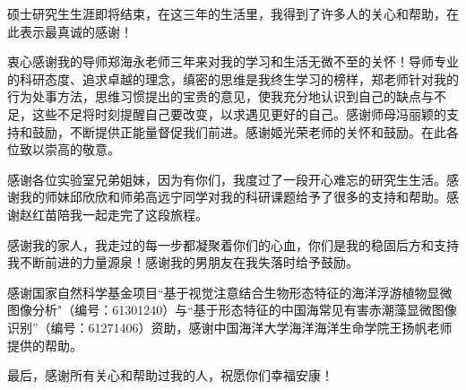 
\begin{ack}
硕士研究生生涯即将结束，在这三年的生活里，我得到了许多人的关心和帮助，在此表示最真诚的感谢！

衷心感谢我的导师郑海永老师三年来对我的学习和生活无微不至的关怀！导师专业的科研态度、追求卓越的理念，缜密的思维是我终生学习的榜样，郑老师针对我的行为处事方法，思维习惯提出的宝贵的意见，使我充分地认识到自己的缺点与不足，这些不足将时刻提醒自己要改变，以求遇见更好的自己。感谢师母冯丽颖的支持和鼓励，不断提供正能量督促我们前进。感谢姬光荣老师的关怀和鼓励。在此各位致以崇高的敬意。

感谢各位实验室兄弟姐妹，因为有你们，我度过了一段开心难忘的研究生生活。感谢我的师妹邱欣欣和师弟高远宁同学对我的科研课题给予了很多的支持和帮助。感谢赵红苗陪我一起走完了这段旅程。

感谢我的家人，我走过的每一步都凝聚着你们的心血，你们是我的稳固后方和支持我不断前进的力量源泉！感谢我的男朋友在我失落时给予鼓励。

感谢国家自然科学基金项目``基于视觉注意结合生物形态特征的海洋浮游植物显微图像分析"（编号：61301240）与``基于形态特征的中国海常见有害赤潮藻显微图像识别''（编号：61271406）资助，感谢中国海洋大学海洋海洋生命学院王扬帆老师提供的帮助。

最后，感谢所有关心和帮助过我的人，祝愿你们幸福安康！
\end{ack}
